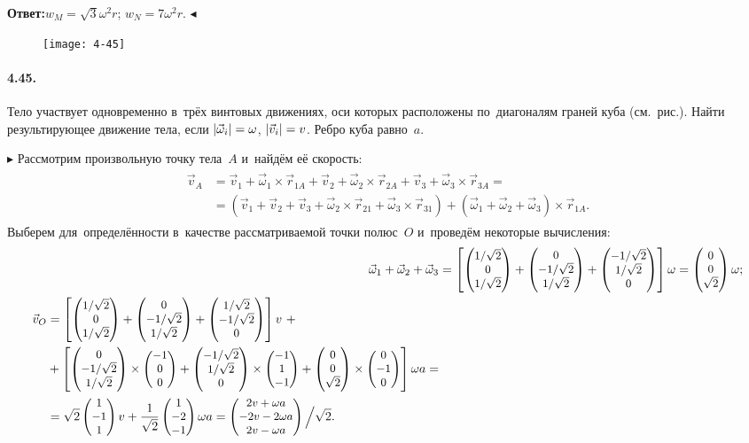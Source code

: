 \documentclass{weekly}
\begin{document}
\textbf{Ответ:}\quad $w_M = \sqrt{3}\omega^2 r$;\qquad
$w_N = 7\omega^2 r$. \hfill $\blacktriangleleft$


\begin{wrapfigure}[9]{l}{4.7cm}
    \texttt{[image: 4-45]}
\end{wrapfigure}
\paragraph{4.45.} Тело участвует одновременно в~трёх винтовых
движениях, оси которых расположены по~диагоналям граней куба
(см.~рис.). Найти результирующее движение тела, если
$\left| \vec\omega_i \right| = \omega$, $\left| \vec v_i \right| = v$.
Ребро куба равно~$a$.

$\blacktriangleright$ Рассмотрим произвольную точку тела~$A$
и~найдём её скорость:
\begin{align}
\begin{split}
    \vec v_A &= \vec v_1 + \vec\omega_1 \times \vec r_{1A} +
            \vec v_2 + \vec\omega_2 \times \vec r_{2A} +
            \vec v_3 + \vec\omega_3 \times \vec r_{3A} = \\
        &= \left(\vec v_1 + \vec v_2 + \vec v_3 +
            \vec\omega_2 \times \vec r_{21} +
            \vec\omega_3 \times \vec r_{31}\right) +
            \left(\vec\omega_1 + \vec\omega_2 + \vec\omega_3\right)
            \times \vec r_{1A}.
\end{split}
\end{align}
Выберем для~определённости в~качестве рассматриваемой точки полюс~$O$
и~проведём некоторые вычисления:
\begin{align}
    \vec\omega_1 + \vec\omega_2 + \vec\omega_3 &=
            \left[ \small\begin{pmatrix}1/\sqrt{2}\\0\\1/\sqrt{2}\end{pmatrix} +
            \small\begin{pmatrix}0\\-1/\sqrt{2}\\1/\sqrt{2}\end{pmatrix} +
            \small\begin{pmatrix}-1/\sqrt{2}\\1/\sqrt{2}\\0\end{pmatrix} \right] \omega
        = \small\begin{pmatrix}0\\0\\\sqrt{2}\end{pmatrix} \omega; \label{4.45:omegasum}
\\
\begin{split}
    \vec v_O &= \left[ \small\begin{pmatrix}1/\sqrt{2}\\0\\1/\sqrt{2}\end{pmatrix} +
            \small\begin{pmatrix}0\\-1/\sqrt{2}\\1/\sqrt{2}\end{pmatrix} +
            \small\begin{pmatrix}1/\sqrt{2}\\-1/\sqrt{2}\\0\end{pmatrix} \right] v ~+\\
        &+ \left[ \small\begin{pmatrix}0\\-1/\sqrt{2}\\1/\sqrt{2}\end{pmatrix} \times
            \small\begin{pmatrix}-1\\0\\0\end{pmatrix} + \small\begin{pmatrix}-1/\sqrt{2}\\1/\sqrt{2}\\0\end{pmatrix}
            \times \small\begin{pmatrix}-1\\1\\-1\end{pmatrix} + \small\begin{pmatrix}0\\0\\\sqrt{2}\end{pmatrix} \times
            \small\begin{pmatrix}0\\-1\\0\end{pmatrix} \right] \omega a = \\
        &= \sqrt{2} \small\begin{pmatrix}1\\-1\\1\end{pmatrix} v +
            \frac{1}{\sqrt{2}} \small\begin{pmatrix}1\\-2\\-1\end{pmatrix} \omega a
        = \small\begin{pmatrix}2v + \omega a\\-2v - 2\omega a\\2v - \omega a\end{pmatrix}
            \Big/ \sqrt{2}.
\end{split}
\end{align}
\end{document}
